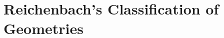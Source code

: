 \documentclass[submitted]{article}
\begin{document}
%


\appendix
\section{Reichenbach's Classification of Geometries}
\label{appendix}
\end{document}
